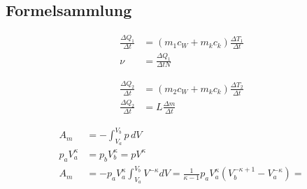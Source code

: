 \subsection*{Formelsammlung}

\begin{align*}
  \frac{ΔQ_1}{Δt} &= \left(m_1c_W + m_kc_k\right)\frac{ΔT_1}{Δt}\\
  ν &= \frac{ΔQ_1}{ΔtN}
\end{align*}

\begin{align*}
 \frac{ΔQ_2}{Δt} &= \left(m_2c_W + m_kc_k\right)\frac{ΔT_2}{Δt}\\
 \frac{ΔQ_2}{Δt} &= L\frac{Δm}{Δt}
\end{align*}

\begin{align*}
  A_m &= -\int_{V_a}^{V_b}p \,dV\\
  p_aV_a^κ &= p_bV_b^κ = pV^\kappa\\
  A_m &= -p_aV_a^κ \int_{V_a}^{V_b} V^{-κ}dV = \frac{1}{κ - 1}p_aV_a^κ\left(V_b^{-κ+1} - V_a^{-κ}\right)
  = 
\end{align*}

